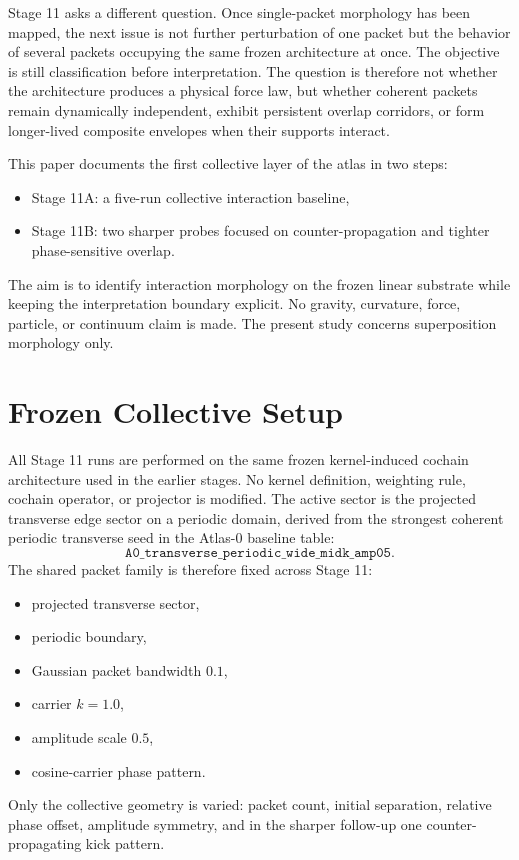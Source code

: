 \documentclass[11pt]{article}
\begin{document}
Stage 11 asks a different question. Once single-packet morphology has been mapped, the next issue is not further perturbation of one packet but the behavior of several packets occupying the same frozen architecture at once. The objective is still classification before interpretation. The question is therefore not whether the architecture produces a physical force law, but whether coherent packets remain dynamically independent, exhibit persistent overlap corridors, or form longer-lived composite envelopes when their supports interact.

This paper documents the first collective layer of the atlas in two steps:
\begin{itemize}
\item Stage 11A: a five-run collective interaction baseline,
\item Stage 11B: two sharper probes focused on counter-propagation and tighter phase-sensitive overlap.
\end{itemize}
The aim is to identify interaction morphology on the frozen linear substrate while keeping the interpretation boundary explicit. No gravity, curvature, force, particle, or continuum claim is made. The present study concerns superposition morphology only.

\section{Frozen Collective Setup}
All Stage 11 runs are performed on the same frozen kernel-induced cochain architecture used in the earlier stages. No kernel definition, weighting rule, cochain operator, or projector is modified. The active sector is the projected transverse edge sector on a periodic domain, derived from the strongest coherent periodic transverse seed in the Atlas-0 baseline table:
\begin{equation}
\texttt{A0\_transverse\_periodic\_wide\_midk\_amp05}.
\end{equation}
The shared packet family is therefore fixed across Stage 11:
\begin{itemize}
\item projected transverse sector,
\item periodic boundary,
\item Gaussian packet bandwidth $0.1$,
\item carrier $k = 1.0$,
\item amplitude scale $0.5$,
\item cosine-carrier phase pattern.
\end{itemize}
Only the collective geometry is varied: packet count, initial separation, relative phase offset, amplitude symmetry, and in the sharper follow-up one counter-propagating kick pattern.
\end{document}
